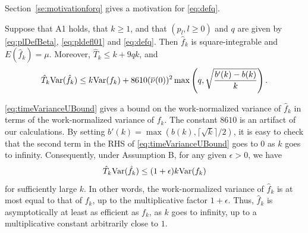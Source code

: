 \documentclass[a4paper,11pt]{article}
\begin{document}
Section~\ref{se:motivationforq} gives a motivation for \eqref{eq:defq}. 
\begin{theorem}\label{th:main}
Suppose that A1 holds, that \(k\ge1\), and that  \((p_{l},l\geq0)\) and \(q\) are given by \eqref{eq:plDefBeta}, \eqref{eq:pldefl01} and \eqref{eq:defq}. Then \(\hat f_{k}\) is square-integrable and \(E(\hat f_{k})=\mu\). Moreover,  \(\hat T_{k}\le k+9qk\), and \begin{equation}\label{eq:timeVarianceUBound}
\hat T_{k}{\rm Var}(\hat f_{k})\leq k{\rm Var}(f_{k})+8610(\overline{\nu}(0))^{2}\max\left(q,\sqrt{\frac{b'(k)-b(k)}{k}}\right).
\end{equation}  
\end{theorem}
\eqref{eq:timeVarianceUBound} gives a bound on the work-normalized variance of \(\hat f_{k}\) in terms of the work-normalized variance of \(f_{k}\). The constant \(8610\) is an artifact of our calculations. By setting \(b'(k)=\max(b(k),\lceil\sqrt{k}\rceil/2)\), it is easy to check that the second term in the  RHS of  \eqref{eq:timeVarianceUBound} goes to \(0\) as \(k\) goes to infinity. Consequently, under Assumption B, for any given \(\epsilon>0\), we have\begin{equation*}
\hat T_{k}{\rm Var}(\hat f_{k})\leq (1+\epsilon)k{\rm Var}(f_{k})
\end{equation*} for sufficiently large \(k\).
In other words, the work-normalized variance of \(\hat f_{k}\) is at most equal to that of \(f_{k}\), up to the multiplicative factor \(1+\epsilon\). Thus, \(\hat f_{k}\) is asymptotically at least as efficient as  \(f_{k}\), as \(k\) goes to infinity,  up to a multiplicative constant arbitrarily close to \(1\).   
\end{document}
